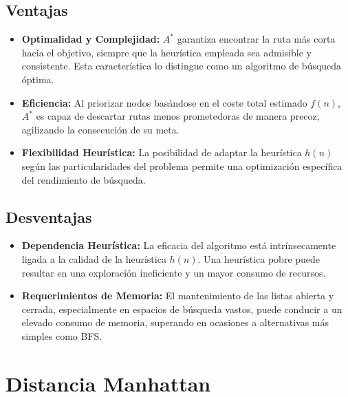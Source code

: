 \subsection{Ventajas}
\begin{itemize}
    \item \textbf{Optimalidad y Complejidad:} $A^{*}$ garantiza encontrar la ruta más corta hacia el objetivo, siempre que la heurística empleada sea admisible y consistente. Esta característica lo distingue como un algoritmo de búsqueda óptima.
    \item \textbf{Eficiencia:} Al priorizar nodos basándose en el coste total estimado \(f(n)\), $A^{*}$ es capaz de descartar rutas menos prometedoras de manera precoz, agilizando la consecución de su meta.
    \item \textbf{Flexibilidad Heurística:} La posibilidad de adaptar la heurística \(h(n)\) según las particularidades del problema permite una optimización específica del rendimiento de búsqueda.
\end{itemize}
\subsection{Desventajas}
\begin{itemize}
    \item \textbf{Dependencia Heurística:} La eficacia del algoritmo está intrínsecamente ligada a la calidad de la heurística \(h(n)\). Una heurística pobre puede resultar en una exploración ineficiente y un mayor consumo de recursos.
    \item \textbf{Requerimientos de Memoria:} El mantenimiento de las listas abierta y cerrada, especialmente en espacios de búsqueda vastos, puede conducir a un elevado consumo de memoria, superando en ocasiones a alternativas más simples como BFS.
\end{itemize}
\section{Distancia Manhattan}

